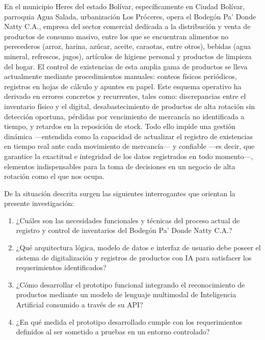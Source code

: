 \documentclass[12pt, letterpaper]{report}
\begin{document}
En el municipio Heres del estado Bolívar, específicamente en Ciudad
Bolívar, parroquia Agua Salada, urbanización Los Próceres, opera el
Bodegón Pa' Donde Natty C.A., empresa del sector
comercial dedicada a la distribución y venta de productos de consumo
masivo, entre los que se encuentran alimentos no perecederos (arroz,
harina, azúcar, aceite, caraotas, entre otros), bebidas (agua mineral,
refrescos, jugos), artículos de higiene personal y productos de limpieza
del hogar. El control de existencias de esta amplia gama de productos se
lleva actualmente mediante procedimientos manuales: conteos físicos
periódicos, registros en hojas de cálculo y apuntes en papel. Este
esquema operativo ha derivado en errores concretos y recurrentes, tales
como: discrepancias entre el inventario físico y el digital,
desabastecimiento de productos de alta rotación sin detección oportuna,
pérdidas por vencimiento de mercancía no identificada a tiempo, y
retardos en la reposición de stock. Todo ello impide una gestión
dinámica ---entendida como la capacidad de actualizar el registro de
existencias en tiempo real ante cada movimiento de mercancía--- y
confiable ---es decir, que garantice la exactitud e integridad de los
datos registrados en todo momento---, elementos indispensables para la
toma de decisiones en un negocio de alta rotación como el que nos
ocupa.

De la situación descrita surgen las siguientes interrogantes que orientan
la presente investigación:

\begin{enumerate}
  \item ¿Cuáles son las necesidades funcionales y técnicas del proceso
        actual de registro y control de inventarios del Bodegón Pa'
        Donde Natty C.A.?

  \item ¿Qué arquitectura lógica, modelo de datos e interfaz de usuario
        debe poseer el sistema de digitalización y registros de
        productos con IA para satisfacer los requerimientos
        identificados?

  \item ¿Cómo desarrollar el prototipo funcional integrando el
        reconocimiento de productos mediante un modelo de lenguaje
        multimodal de Inteligencia Artificial consumido a través de
        su API?

  \item ¿En qué medida el prototipo desarrollado cumple con los
        requerimientos definidos al ser sometido a pruebas en un
        entorno controlado?
\end{enumerate}
\end{document}
